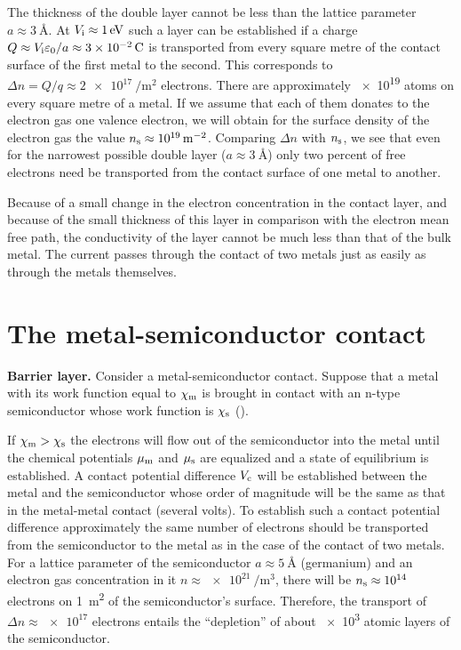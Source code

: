 The thickness of the double layer cannot be less than the lattice parameter $a\approx\SI{3}{\angstrom}$. At $V_{\text{i}}\approx\SI{1}{\electronvolt}$ such a layer can be established if a charge $Q\approx V_{\text{i}}\varepsilon_0/a\approx\SI{3e-2}{\coulomb}$ is transported from every square metre of the contact surface of the first metal to the second. This corresponds to $\Delta{n}=Q/q\approx\SI{2e17}{\per\metre\squared}$ electrons. There are approximately \num{e19} atoms on every square metre of a metal. If we assume that each of them donates to the electron gas one valence electron, we will obtain for the surface density of the electron gas the value $n_{\text{s}}\approx\SI{e19}{\per\metre\squared}$.
Comparing $\Delta{n}$ with $n_{\text{s}}$, we see that even for the narrowest possible double layer ($a\approx\SI{3}{\angstrom}$) only two percent of free electrons need be transported from the contact surface of one metal to another.

Because of a small change in the electron concentration in the contact layer, and because of the small thickness of this layer in comparison with the electron mean free path, the conductivity of the layer cannot be much less than that of the bulk metal. The current passes through the contact of two metals just as easily as through the metals themselves.

\section{The metal-semiconductor contact}\label{sec:75}

\textbf{Barrier layer.} Consider a metal-semiconductor contact. Suppose that a metal with its work function equal to $\chi_{\text{m}}$ is brought in contact with an n-type semiconductor whose work function is $\chi_{\text{s}}$ ().

If $\chi_{\text{m}}>\chi_{\text{s}}$ the electrons will flow out of the semiconductor into the metal until the chemical potentials $\mu_{\text{m}}$ and $\mu_{\text{s}}$ are equalized and a state of equilibrium is established. A contact potential difference $V_{\text{c}}$ will be established between the metal and the semiconductor whose order of magnitude will be the same as that in the metal-metal
contact (several volts). To establish such a contact potential difference approximately the same number of electrons should be transported from the semiconductor to the metal as in the case of the contact of two metals. For a lattice parameter of the semiconductor $a\approx\SI{5}{\angstrom}$ (germanium) and an electron gas concentration in it
$n\approx\SI{e21}{\per\metre\cubed}$, there will be $n_{\text{s}}\approx\num{e14}$ electrons on \SI{1}{\metre\squared} of the semiconductor's surface. Therefore, the transport of $\Delta{n}\approx\num{e17}$ electrons entails the ``depletion'' of about \num{e3} atomic layers of the semiconductor.

